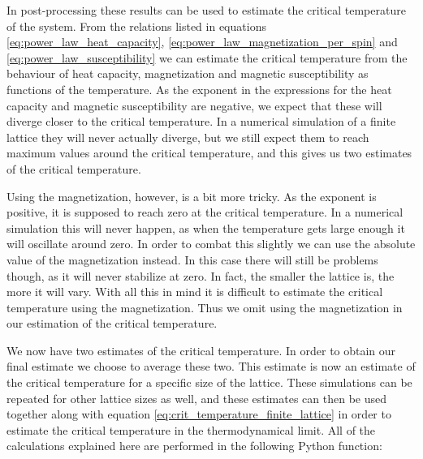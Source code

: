 \documentclass[reprint,english,notitlepage]{revtex4-1}  %
\begin{document}
In post-processing these results can be used to estimate the critical temperature of the system. From the relations listed in equations \eqref{eq:power_law_heat_capacity}, \eqref{eq:power_law_magnetization_per_spin} and \eqref{eq:power_law_susceptibility} we can estimate the critical temperature from the behaviour of heat capacity, magnetization and magnetic susceptibility as functions of the temperature. As the exponent in the expressions for the heat capacity and magnetic susceptibility are negative, we expect that these will diverge closer to the critical temperature. In a numerical simulation of a finite lattice they will never actually diverge, but we still expect them to reach maximum values around the critical temperature, and this gives us two estimates of the critical temperature. 

Using the magnetization, however, is a bit more tricky. As the exponent is positive, it is supposed to reach zero at the critical temperature. In a numerical simulation this will never happen, as when the temperature gets large enough it will oscillate around zero. In order to combat this slightly we can use the absolute value of the magnetization instead. In this case there will still be problems though, as it will never stabilize at zero. In fact, the smaller the lattice is, the more it will vary. With all this in mind it is difficult to estimate the critical temperature using the magnetization. Thus we omit using the magnetization in our estimation of the critical temperature.

We now have two estimates of the critical temperature. In order to obtain our final estimate we choose to average these two. This estimate is now an estimate of the critical temperature for a specific size of the lattice. These simulations can be repeated for other lattice sizes as well, and these estimates can then be used together along with equation \eqref{eq:crit_temperature_finite_lattice} in order to estimate the critical temperature in the thermodynamical limit. All of the calculations explained here are performed in the following Python function:
\end{document}
